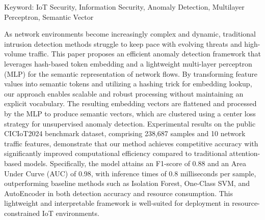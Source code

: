 \begin{EnAbstract}
    \begin{EnAbstractItems}








        \noindent \text Keyword: IoT Security, Information Security, Anomaly Detection, Multilayer Perceptron, Semantic Vector

    \end{EnAbstractItems}

    \begin{EnAbstractDescription}
        As network environments become increasingly complex and dynamic, traditional intrusion detection methods struggle to keep pace with evolving threats and high-volume traffic. This paper proposes an efficient anomaly detection framework that leverages hash-based token embedding and a lightweight multi-layer perceptron (MLP) for the semantic representation of network flows. By transforming feature values into semantic tokens and utilizing a hashing trick for embedding lookup, our approach enables scalable and robust processing without maintaining an explicit vocabulary. The resulting embedding vectors are flattened and processed by the MLP to produce semantic vectors, which are clustered using a center loss strategy for unsupervised anomaly detection. Experimental results on the public CICIoT2024 benchmark dataset, comprising 238,687 samples and 10 network traffic features, demonstrate that our method achieves competitive accuracy with significantly improved computational efficiency compared to traditional attention-based models. Specifically, the model attains an F1-score of 0.88 and an Area Under Curve (AUC) of 0.98, with inference times of 0.8 milliseconds per sample, outperforming baseline methods such as Isolation Forest, One-Class SVM, and AutoEncoder in both detection accuracy and resource consumption. This lightweight and interpretable framework is well-suited for deployment in resource-constrained IoT environments.

    \end{EnAbstractDescription}

\end{EnAbstract}

